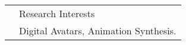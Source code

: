 \documentclass[letterpaper, 11pt]{article}
\newcommand{\headingfont}{\Large\color{OliveGreen}\vspace{-.4cm}}
\newenvironment{SectionTable}[1]{
	\renewcommand*{\arraystretch}{1.2}
	\setlength{\tabcolsep}{10pt} %
	\begin{longtable}{Rp{5.8in}} & #1 \\}
{\end{longtable}\vspace{-.4cm}}
\begin{document}


\begin{SectionTable}{\headingfont Research Interests}
	&
	Digital Avatars, Animation Synthesis.
	\end{SectionTable}

  


\end{document}
